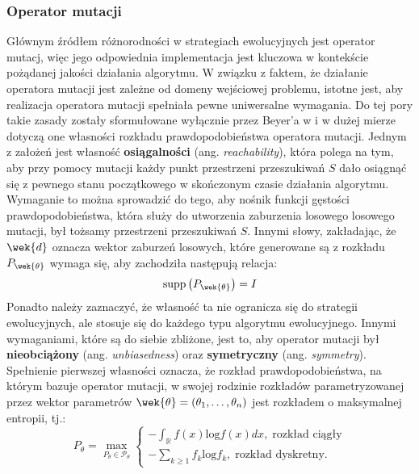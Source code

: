 \subsubsection{Operator mutacji}
\label{subsubsec:es-conv}
    Głównym źródłem różnorodności w strategiach ewolucyjnych jest operator mutacj, więc jego odpowiednia implementacja jest kluczowa w kontekście pożądanej jakości działania algorytmu. W związku z faktem, że działanie operatora mutacji jest zależne od
    domeny wejściowej problemu, istotne jest, aby realizacja operatora mutacji spełniała pewne uniwersalne wymagania. Do tej pory takie zasady zostały sformułowane wyłącznie przez Beyer'a w \cite{Beyer:2001} i w dużej mierze dotyczą one własności rozkładu prawdopodobieństwa operatora mutacji. Jednym z założeń jest własność \textbf{osiągalności} (ang. \textit{reachability}), która polega na tym, aby przy pomocy mutacji każdy punkt przestrzeni przeszukiwań $S$ dało osiągnąć się z pewnego stanu początkowego w skończonym czasie działania algorytmu. Wymaganie to można sprowadzić do tego, aby nośnik funkcji gęstości prawdopodobieństwa, która służy do utworzenia zaburzenia losowego losowego mutacji, był tożsamy przestrzeni przeszukiwań $S$. Innymi słowy, zakładając, że $\wek{d}$ oznacza wektor zaburzeń losowych, które generowane są z rozkładu $P_{\wek{\theta}}$ wymaga się, aby zachodziła następują relacja:
    \begin{equation}
        \label{eq:es-supp}
        \text{supp}\left(P_{\wek{\theta}}\right) = I
    \end{equation}
    Ponadto należy zaznaczyć, że własność ta nie ogranicza się do strategii ewolucyjnych, ale stosuje się do każdego typu algorytmu ewolucyjnego. Innymi wymaganiami, które są do siebie zbliżone, jest to, aby operator mutacji był \textbf{nieobciążony} (ang. \textit{unbiasedness}) oraz \textbf{symetryczny} (ang. \textit{symmetry}). Spełnienie pierwszej własności oznacza, że rozkład prawdopodobieństwa, na którym bazuje operator mutacji, w swojej rodzinie rozkładów parametryzowanej przez wektor parametrów $\wek{\theta} = (\theta_1, \dots, \theta_n)$ jest rozkładem o maksymalnej entropii, tj.:
    \begin{equation}
        \label{eq:es-entropy}
        P_{\theta} = \max_{P_\theta \in \mathcal{P}_{\theta}}
            \begin{cases}
                -\int_{\mathbb{R}}{f(x)\text{log}f(x)dx},\; \mbox{rozkład ciągły} \\
                -\sum_{k \geq 1} f_{k} \text{log}f_k,\; \mbox{rozkład dyskretny}.
            \end{cases}
    \end{equation}

